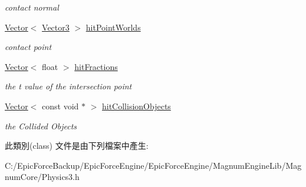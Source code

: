 \begin{DoxyCompactItemize}
\begin{DoxyCompactList}\small\item\em contact normal \end{DoxyCompactList}\item 
\hyperlink{class_magnum_1_1_vector}{Vector}$<$ \hyperlink{class_magnum_1_1_vector3}{Vector3} $>$ \hyperlink{class_magnum_1_1_physics3_1_1_ray_cast_result_a56cecea6bc4102a867063dee7b3c9f37}{hit\+Point\+Worlds}\hypertarget{class_magnum_1_1_physics3_1_1_ray_cast_result_a56cecea6bc4102a867063dee7b3c9f37}{}\label{class_magnum_1_1_physics3_1_1_ray_cast_result_a56cecea6bc4102a867063dee7b3c9f37}

\begin{DoxyCompactList}\small\item\em contact point \end{DoxyCompactList}\item 
\hyperlink{class_magnum_1_1_vector}{Vector}$<$ float $>$ \hyperlink{class_magnum_1_1_physics3_1_1_ray_cast_result_ae75d240b477d165f2b514337e5b04324}{hit\+Fractions}\hypertarget{class_magnum_1_1_physics3_1_1_ray_cast_result_ae75d240b477d165f2b514337e5b04324}{}\label{class_magnum_1_1_physics3_1_1_ray_cast_result_ae75d240b477d165f2b514337e5b04324}

\begin{DoxyCompactList}\small\item\em the t value of the intersection point \end{DoxyCompactList}\item 
\hyperlink{class_magnum_1_1_vector}{Vector}$<$ const void $\ast$ $>$ \hyperlink{class_magnum_1_1_physics3_1_1_ray_cast_result_a552c16cfe0ed6580792fc8fa3589e216}{hit\+Collision\+Objects}\hypertarget{class_magnum_1_1_physics3_1_1_ray_cast_result_a552c16cfe0ed6580792fc8fa3589e216}{}\label{class_magnum_1_1_physics3_1_1_ray_cast_result_a552c16cfe0ed6580792fc8fa3589e216}

\begin{DoxyCompactList}\small\item\em the Collided Objects \end{DoxyCompactList}\end{DoxyCompactItemize}


此類別(class) 文件是由下列檔案中產生\+:\begin{DoxyCompactItemize}
\item 
C\+:/\+Epic\+Force\+Backup/\+Epic\+Force\+Engine/\+Epic\+Force\+Engine/\+Magnum\+Engine\+Lib/\+Magnum\+Core/Physics3.\+h\end{DoxyCompactItemize}

